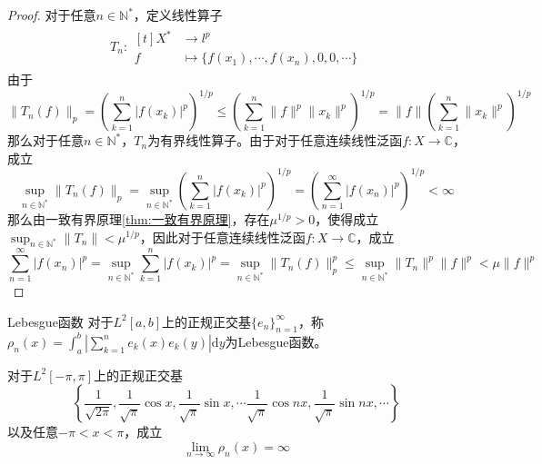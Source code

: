 \documentclass[lang = cn, scheme = chinese, thmcnt = section]{elegantbook}
\newcommand{\N}{\mathbb{N}}            %
\newcommand{\C}{\mathbb{C}}  		   %
\begin{document}
\begin{proof}
	对于任意$n\in\mathbb{N}^*$，定义线性算子
	\begin{align*}
		T_n:\begin{aligned}[t]
			X^*&\longrightarrow l^p\\
			f&\longmapsto \{ f(x_1),\cdots,f(x_n),0,0,\cdots \}
		\end{aligned}
	\end{align*}
	由于
	$$
	\|T_n(f)\|_p
	= \left(\sum_{k=1}^{n}|f(x_k)|^p\right)^{1/p}
	\le \left(\sum_{k=1}^{n}\|f\|^p\|x_k\|^p\right)^{1/p}
	= \|f\|\left(\sum_{k=1}^{n}\|x_k\|^p\right)^{1/p}
	$$
	那么对于任意$n\in\N^*$，$T_n$为有界线性算子。由于对于任意连续线性泛函$f:X\to\C$，成立
	$$
	\sup_{n\in\N^*}\|T_n(f)\|_p
	= \sup_{n\in\N^*}\left(\sum_{k=1}^{n}|f(x_k)|^p\right)^{1/p}
	= \left(\sum_{n=1}^{\infty}|f(x_n)|^p\right)^{1/p}
	<\infty
	$$
	那么由一致有界原理\ref{thm:一致有界原理}，存在$\mu^{1/p}>0$，使得成立$\displaystyle \sup_{n\in\N^*}\|T_n\|<\mu^{1/p}$，因此对于任意连续线性泛函$f:X\to\C$，成立
	$$
	\sum_{n=1}^{\infty}|f(x_n)|^p
	= \sup_{n\in\N^*}\sum_{k=1}^{n}|f(x_k)|^p
	= \sup_{n\in\N^*}\|T_n(f)\|_p^p
	\le \sup_{n\in\N^*}\|T_n\|^p\|f\|^p
	< \mu \|f\|^p
	$$
\end{proof}

\begin{definition}{Lebesgue函数}
	对于$L^2[a,b]$上的正规正交基$\{e_n\}_{n=1}^{\infty}$，称$\displaystyle\rho_n(x)=\int_a^b\left| \sum_{k=1}^{n}e_k(x)e_k(y) \right|\mathrm{d}y$为Lebesgue函数。
\end{definition}

\begin{proposition}
	对于$L^2[-\pi,\pi]$上的正规正交基
	$$
	\left\{ \frac{1}{\sqrt{2\pi}},\frac{1}{\sqrt{\pi}}\cos x,\frac{1}{\sqrt{\pi}}\sin x,\cdots \frac{1}{\sqrt{\pi}}\cos nx,\frac{1}{\sqrt{\pi}}\sin nx,\cdots \right\}
	$$
	以及任意$-\pi<x<\pi$，成立
	$$
	\lim_{n\to\infty}\rho_n(x)=\infty
	$$
\end{proposition}
\end{document}
